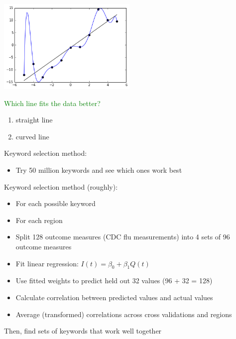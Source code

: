 \documentclass[aspectratio=169]{beamer}
\def\vf{\vfill}
\begin{document}
\begin{frame}

\begin{center}
\includegraphics[width=0.5\textwidth]{figures/overfitted_data}
\end{center}

\textcolor{green}{Which line fits the data better?}
\begin{enumerate}
\item straight line
\item curved line
\end{enumerate}

\vf
{}

\end{frame}
\begin{frame}

Keyword selection method:
\begin{itemize}
\item Try 50 million keywords and see which ones work best
\end{itemize}

\end{frame}
\begin{frame}

Keyword selection method (roughly):
\begin{itemize}
\item For each possible keyword
\item For each region
\item Split 128 outcome measures (CDC flu measurements) into 4 sets of 96 outcome measures 
\item Fit linear regression: $I(t) = \beta_0 + \beta_1 Q(t)$
\item Use fitted weights to predict held out 32 values (96 + 32 = 128) 
\item Calculate correlation between predicted values and actual values
\item Average (transformed) correlations across cross validations and regions
\end{itemize}
\vf
Then, find sets of keywords that work well together
\end{frame}
\end{document}
